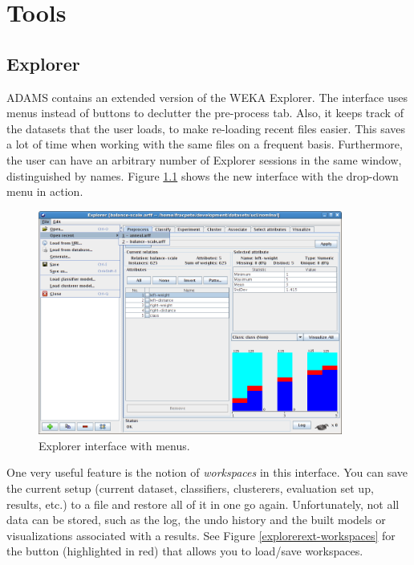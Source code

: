 %

\chapter{Tools}

\section{Explorer}
ADAMS contains an extended version of the WEKA Explorer. The interface uses
menus instead of buttons to declutter the pre-process tab. Also, it keeps track
of the datasets that the user loads, to make re-loading recent files easier.
This saves a lot of time when working with the same files on a frequent basis.
Furthermore, the user can have an arbitrary number of Explorer sessions in the
same window, distinguished by names. Figure \ref{explorerext} shows the new
interface with the drop-down menu in action.

\begin{figure}[htb]
  \centering
  \includegraphics[width=10.0cm]{images/explorerext.png}
  \caption{Explorer interface with menus.}
  \label{explorerext}
\end{figure}

One very useful feature is the notion of \textit{workspaces} in this interface.
You can save the current setup (current dataset, classifiers, clusterers, 
evaluation set up, results, etc.) to a file and restore all of it in one go 
again. Unfortunately, not all data can be stored, such as the log, the undo
history and the built models or visualizations associated with a results.
See Figure \ref{explorerext-workspaces} for the button (highlighted in red) 
that allows you to load/save workspaces.

